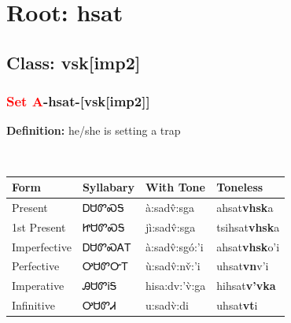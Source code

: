 \needspace{4in}
\section*{Root: hsat}
\nopagebreak
{}
\needspace{3in}
\subsection*{Class: vsk[imp2]}
\nopagebreak
\needspace{2in}
\subsubsection*{\textcolor{Red}{Set A}{-}\textbf{hsat}{-}[vsk[imp2]]}
\nopagebreak
\textbf{Definition: } he/she is setting a trap
\\[0.5em]
\begin{tabularx}{\textwidth}{l X X X}%
\toprule%
\textbf{Form}&\textbf{Syllabary}&\textbf{With Tone}&\textbf{Toneless}\\%
\midrule%
Present&ᎠᏌᏛᏍᎦ&à:sadv̂:sga&ahsat\textbf{vhsk}a\\%
1st Present&ᏥᏌᏛᏍᎦ&jì:sadv̂:sga&tsihsat\textbf{vhsk}a\\%
Imperfective&ᎠᏌᏛᏍᎪᎢ&à:sadv̂:sgó:’i&ahsat\textbf{vhsk}o'i\\%
Perfective&ᎤᏌᏛᏅᎢ&ù:sadv̂:nv̌:’i&uhsat\textbf{vn}v'i\\%
Imperative&ᎯᏌᏛᎥᎦ&hisa:dv:’v̀:ga&hihsat\textbf{v'vka}\\%
Infinitive&ᎤᏌᏛᏗ&u:sadv̀:di&uhsat\textbf{vt}i\\%
\bottomrule%
\end{tabularx}
\\[1em]